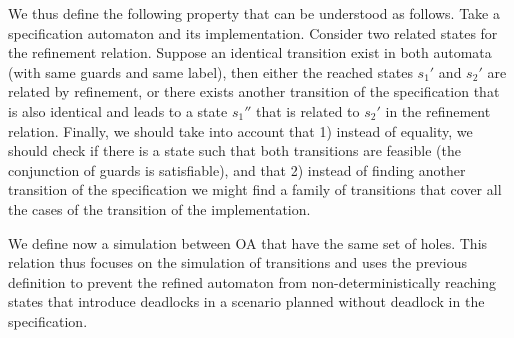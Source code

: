 \documentclass[runningheads]{llncs}
\begin{document}

We thus define the following property that can be understood as follows. Take a specification automaton and its implementation. Consider two related states for the refinement relation. Suppose an identical transition exist in both automata (with same guards and same label), then either the reached states $s_1'$ and $s_2'$ are related by refinement, or there exists another transition of the specification that is also identical and leads to a state $s_1''$ that is related to $s_2'$ in the refinement relation.
Finally, we should take into account that 1) instead of equality, we should check if there is a state such that both transitions are feasible (the conjunction of guards is satisfiable), and that  2) instead of finding another transition of the specification we might find a family of transitions that cover all the cases of the transition of the implementation. 



We define now a simulation between OA that have the same set of holes. This relation thus focuses on the simulation of transitions and uses the previous definition to prevent the refined automaton from non-deterministically reaching states that introduce deadlocks in a scenario planned without deadlock in the specification.
\end{document}
